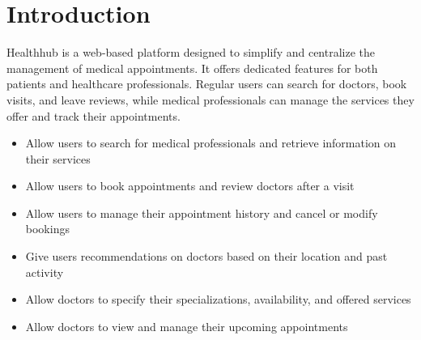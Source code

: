 \section{Introduction}
Healthhub is a web-based platform designed to simplify and centralize the management of medical appointments. It offers dedicated features for both patients and healthcare professionals. Regular users can search for doctors, book visits, and leave reviews, while medical professionals can manage the services they offer and track their appointments.

    \begin{itemize}
        \item Allow users to search for medical professionals and retrieve information on their services
        \item Allow users to book appointments and review doctors after a visit
        \item Allow users to manage their appointment history and cancel or modify bookings
        \item Give users recommendations on doctors based on their location and past activity
        \item Allow doctors to specify their specializations, availability, and offered services
        \item Allow doctors to view and manage their upcoming appointments
    \end{itemize}
